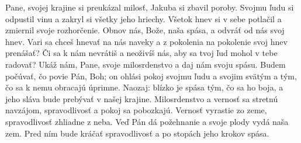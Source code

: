 Pane, svojej krajine si preukázal milosť,
Jakuba si zbavil poroby.
\versseparator
Svojmu ľudu si odpustil vinu
a zakryl si všetky jeho hriechy.
\versseparator
Všetok hnev si v sebe potlačil
a zmiernil svoje rozhorčenie.
\versseparator
Obnov nás, Bože, naša spása,
a odvráť od nás svoj hnev.
\versseparator
Vari sa chceš hnevať na nás naveky
a z pokolenia na pokolenie svoj hnev prenášať?
\versseparator
Či sa k nám nevrátiš a neoživíš nás,
aby sa tvoj ľud mohol v tebe radovať?
\versseparator
Ukáž nám, Pane, svoje milosrdenstvo
a daj nám svoju spásu.
\versseparator
Budem počúvať, čo povie Pán, Boh;
on ohlási pokoj svojmu ľudu 
\versseparator
a svojim svätým
a tým, čo sa k nemu obracajú úprimne.
\versseparator
Naozaj: blízko je spása tým, čo sa ho boja,
a jeho sláva bude prebývať v našej krajine.
\versseparator
Milosrdenstvo a vernosť sa stretnú navzájom,
spravodlivosť a pokoj sa pobozkajú.
\versseparator
Vernosť vyrastie zo zeme,
spravodlivosť zhliadne z neba.
\versseparator
Veď Pán dá požehnanie
a svoje plody vydá naša zem.
\versseparator
Pred ním bude kráčať spravodlivosť
a po stopách jeho krokov spása.